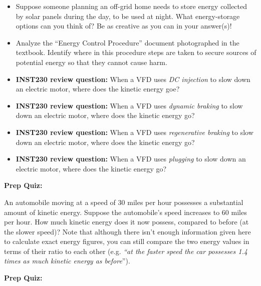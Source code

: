 \begin{itemize}
\item{} Suppose someone planning an off-grid home needs to store energy collected by solar panels during the day, to be used at night.  What energy-storage options can you think of?  Be as creative as you can in your answer(s)!
\item{} Analyze the ``Energy Control Procedure'' document photographed in the textbook.  Identify where in this procedure steps are taken to secure sources of potential energy so that they cannot cause harm.
\item{} {\bf INST230 review question:} When a VFD uses {\it DC injection} to slow down an electric motor, where does the kinetic energy goe?
\item{} {\bf INST230 review question:} When a VFD uses {\it dynamic braking} to slow down an electric motor, where does the kinetic energy go?
\item{} {\bf INST230 review question:} When a VFD uses {\it regenerative braking} to slow down an electric motor, where does the kinetic energy go?
\item{} {\bf INST230 review question:} When a VFD uses {\it plugging} to slow down an electric motor, where does the kinetic energy go?
\end{itemize}












\vfil \eject

\noindent
{\bf Prep Quiz:}

An automobile moving at a speed of 30 miles per hour possesses a substantial amount of kinetic energy.  Suppose the automobile's speed increases to 60 miles per hour.  How much kinetic energy does it now possess, compared to before (at the slower speed)?  Note that although there isn't enough information given here to calculate exact energy figures, you can still compare the two energy values in terms of their ratio to each other (e.g. {\it ``at the faster speed the car possesses 1.4 times as much kinetic energy as before}'').












\vfil \eject

\noindent
{\bf Prep Quiz:}

